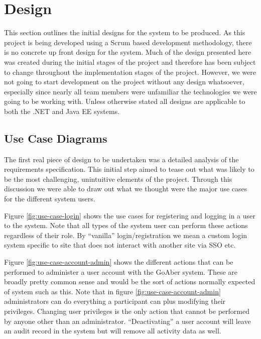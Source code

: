 \chapter{Design}

This section outlines the initial designs for the system to be produced. As this project is being developed using a Scrum based development methodology, there is no concrete up front design for the system. Much of the design presented here was created during the initial stages of the project and therefore has been subject to change throughout the implementation stages of the project. However, we were not going to start development on the project without any design whatsoever, especially since nearly all team members were unfamiliar the technologies we were going to be working with. Unless otherwise stated all designs are applicable to both the .NET and Java EE systems.

\section{Use Case Diagrams}

The first real piece of design to be undertaken was a detailed analysis of the requirements specification. This initial step aimed to tease out what was likely to be the most challenging, unintuitive elements of the project. Through this discussion we were able to draw out what we thought were the major use cases for the different system users.

Figure \ref{fig:use-case-login} shows the use cases for registering and logging in a user to the system. Note that all types of the system user can perform these actions regardless of their role. By ``vanilla'' login/registration we mean a custom login system specific to site that does not interact with another site via SSO etc.

Figure \ref{fig:use-case-account-admin} shows the different actions that can be performed to administer a user account with the GoAber system. These are broadly pretty common sense and would be the sort of actions normally expected of system such as this. Note that in figure \ref{fig:use-case-account-admin} administrators can do everything a participant can plus modifying their privileges. Changing user privileges is the only action that cannot be performed by anyone other than an administrator. ``Deactivating'' a user account will leave an audit record in the system but will remove all activity data as well. 

